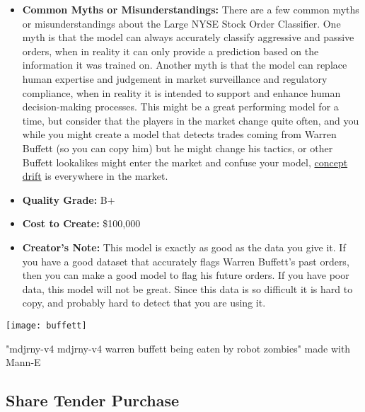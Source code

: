 \begin{itemize}
    \item \textbf{Common Myths or Misunderstandings:} There are a few common myths or misunderstandings about the Large NYSE Stock Order Classifier. One myth is that the model can always accurately classify aggressive and passive orders, when in reality it can only provide a prediction based on the information it was trained on. Another myth is that the model can replace human expertise and judgement in market surveillance and regulatory compliance, when in reality it is intended to support and enhance human decision-making processes. This might be a great performing model for a time, but consider that the players in the market change quite often, and you while you might create a model that detects trades coming from Warren Buffett (so you can copy him) but he might change his tactics, or other Buffett lookalikes might enter the market and confuse your model, \hyperref[sec:drift]{concept drift} is everywhere in the market.
    \item \textbf{Quality Grade:} B+
    \item \textbf{Cost to Create:} \$100,000
    \item \textbf{Creator's Note:} This model is exactly as good as the data you give it. If you have a good dataset that accurately flags Warren Buffett's past orders, then you can make a good model to flag his future orders. If you have poor data, this model will not be great. Since this data is so difficult it is hard to copy, and probably hard to detect that you are using it. 
\end{itemize}

\begin{marginfigure}[-5.5cm]
        \texttt{[image: buffett]}
        \caption{"mdjrny-v4 mdjrny-v4 warren buffett being eaten by robot zombies" made with Mann-E}
\end{marginfigure}

\subsection{Share Tender Purchase}

